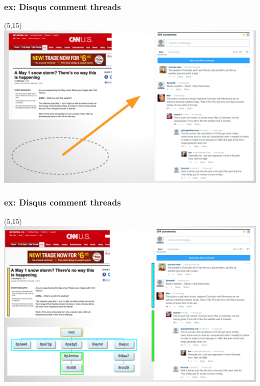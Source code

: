 \documentclass{beamer}
\begin{document}
\begin{frame} \frametitle{ex: Disqus comment threads}

\begin{textblock}{1}(5,15)
	\includegraphics[scale=0.21]{./imgs/disqus1.png}
\end{textblock}

\end{frame}

%

\begin{frame} \frametitle{ex: Disqus comment threads}

\begin{textblock}{1}(5,15)
	\includegraphics[scale=0.21]{./imgs/disqus3.png}
\end{textblock}

\end{frame}

%
\end{document}

